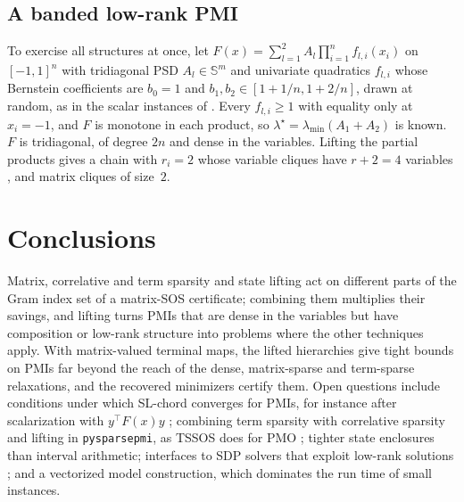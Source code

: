 \documentclass[smallextended]{svjour3}
\newcommand{\Sym}{\mathbb{S}}
\newcommand{\lmin}{\lambda_{\min}}
\newcommand{\code}[1]{\texttt{#1}}
\begin{document}
\subsection{A banded low-rank PMI}
\label{sec:banded}

To exercise all structures at once, let
$F(x)=\sum_{l=1}^{2}A_l\prod_{i=1}^nf_{l,i}(x_i)$ on $[-1,1]^n$ with
tridiagonal PSD $A_l\in\Sym^m$ and univariate quadratics $f_{l,i}$ whose
Bernstein coefficients are $b_0=1$ and $b_1,b_2\in[1+1/n,1+2/n]$, drawn at
random, as in the scalar instances of \cite[Sect.~4.2]{BGHK2025}. Every
$f_{l,i}\ge1$ with equality only at $x_i=-1$, and $F$ is monotone in each
product, so $\lambda^\star=\lmin(A_1+A_2)$ is known. $F$ is tridiagonal, of
degree $2n$ and dense in the variables. Lifting the partial products gives
a chain with $r_i=2$ whose variable cliques have $r+2=4$ variables
\cite{BGHK2025}, and matrix cliques of size~$2$.



\section{Conclusions}
\label{sec:conclusions}

Matrix, correlative and term sparsity and state lifting act on different
parts of the Gram index set of a matrix-SOS certificate; combining them
multiplies their savings, and lifting turns PMIs that are dense in the
variables but have composition or low-rank structure into problems where
the other techniques apply. With matrix-valued terminal maps, the lifted
hierarchies give tight bounds on PMIs far beyond the reach of the dense,
matrix-sparse and term-sparse relaxations, and the recovered minimizers
certify them. Open questions include conditions under which SL-chord
converges for PMIs, for instance after scalarization with $y^\top F(x)y$
\cite{ZhengFantuzzi2023,MillerWangGuo2026}; combining term sparsity with
correlative sparsity and lifting in \code{pysparsepmi}, as TSSOS does for
PMO \cite{MillerWangGuo2026}; tighter state enclosures than interval
arithmetic; interfaces to SDP solvers that exploit low-rank solutions
\cite{HabibiKocvaraStingl2024}; and a vectorized model construction, which
dominates the run time of small instances.




\end{document}
